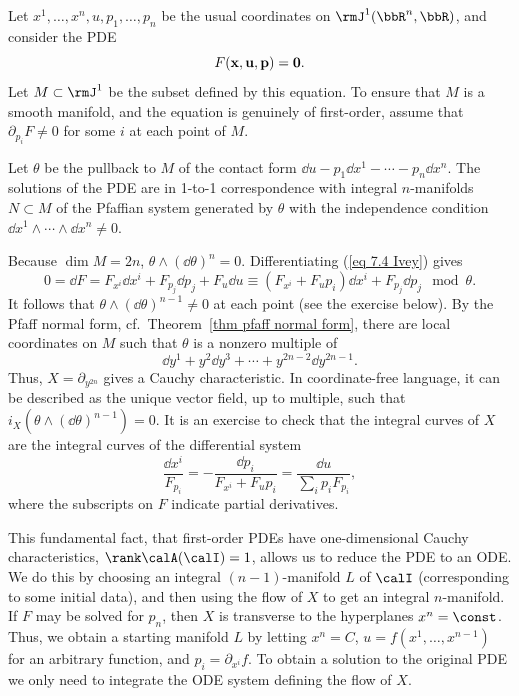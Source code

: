 \begin{example}
    Let $x^1,\ldots,x^n,u,p_1,\ldots,p_n$ be the usual coordinates on $\rmJ^1(\bbR^n,\bbR)$, and consider the PDE 
    \[F(\bf{x},u,\bf{p})=0.\label{eq 7.4 Ivey}\]
    Let $M\subset  \rmJ^1$ be the subset defined by this equation. To ensure that $M$ is a smooth manifold, and the equation is genuinely of first-order, assume that $\partial_{p_i}F\neq 0$ for some $i$ at each point of $M$.

    Let $\theta$ be the pullback to $M$ of the contact form $\dd u-p_1\dd x^1-\cdots-p_n\dd x^n$. The solutions of the PDE are in 1-to-1 correspondence with integral $n$-manifolds $N\subset M$ of the Pfaffian system generated by $\theta$ with the independence condition $\dd x^1\wedge \cdots\wedge\dd x^n\neq 0$.

    Because $\dim M=2n$, $\theta\wedge (\dd\theta)^n=0$. Differentiating (\ref{eq 7.4 Ivey}) gives 
    \[0=\dd F=F_{x^i}\dd x^i+F_{p_j}\dd p_j+F_u\dd u\equiv (F_{x^i}+F_up_i)\dd x^i+F_{p_j}\dd p_j\mod\theta.\]
    It follows that $\theta\wedge (\dd\theta)^{n-1}\neq 0$ at each point (see the exercise below). By the Pfaff normal form, cf.\ Theorem~\ref{thm pfaff normal form}, there are local coordinates on $M$ such that $\theta$ is a nonzero multiple of 
    \[\dd y^1+y^2\dd y^3+\cdots +y^{2n-2}\dd y^{2n-1}.\label{eq 7.5 Ivey}\]
    Thus, $X=\partial_{y^{2n}}$ gives a Cauchy characteristic. In coordinate-free language, it can be described as the unique vector field, up to multiple, such that $i_X(\theta\wedge(\dd\theta)^{n-1})=0$. It is an exercise to check that the integral curves of $X$ are the integral curves of the differential system 
    \[\frac{\dd x^i}{F_{p_i}}=-\frac{\dd p_i}{F_{x^i}+F_u p_i}=\frac{\dd u}{\sum_i p_i F_{p_i}},\label{eq 14 Bryant}\]
    where the subscripts on $F$ indicate partial derivatives.

    This fundamental fact, that first-order PDEs have one-dimensional Cauchy characteristics, $\rank \calA(\calI)=1$, allows us to reduce the PDE to an ODE. We do this by choosing an integral $(n-1)$-manifold $L$ of $\calI$ (corresponding to some initial data), and then using the flow of $X$ to get an integral $n$-manifold. If $F$ may be solved for $p_n$, then $X$ is transverse to the hyperplanes $x^n=\const$. Thus, we obtain a starting manifold $L$ by letting $x^n=C$, $u=f(x^1,\ldots,x^{n-1})$ for an arbitrary function, and $p_i=\partial_{x^i}f$. To obtain a solution to the original PDE we only need to integrate the ODE system defining the flow of $X$.
\end{example}

